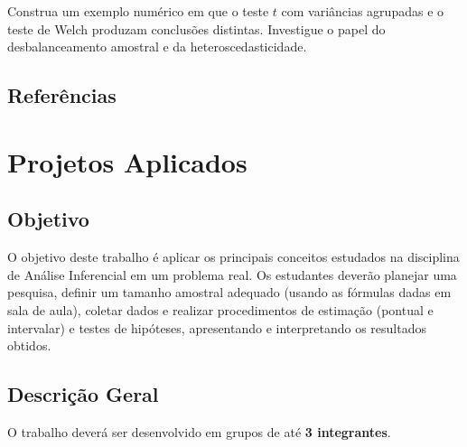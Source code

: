 \documentclass[
  letterpaper,
  DIV=11,
  numbers=noendperiod]{scrreprt}
\begin{document}
\begin{tcolorbox}[enhanced jigsaw, colback=white, leftrule=.75mm, colbacktitle=quarto-callout-note-color!10!white, breakable, titlerule=0mm, bottomtitle=1mm, title=\textcolor{quarto-callout-note-color}{\faInfo}\hspace{0.5em}{Exercício 20}, colframe=quarto-callout-note-color-frame, toprule=.15mm, opacityback=0, bottomrule=.15mm, opacitybacktitle=0.6, arc=.35mm, toptitle=1mm, rightrule=.15mm, coltitle=black, left=2mm]

Construa um exemplo numérico em que o teste \(t\) com variâncias
agrupadas e o teste de Welch produzam conclusões distintas. Investigue o
papel do desbalanceamento amostral e da heteroscedasticidade.

\end{tcolorbox}

\section*{Referências}\label{referuxeancias-5}



\chapter{Projetos Aplicados}\label{projetos-aplicados}

\section{Objetivo}\label{objetivo}

O objetivo deste trabalho é aplicar os principais conceitos estudados na
disciplina de Análise Inferencial em um problema real. Os estudantes
deverão planejar uma pesquisa, definir um tamanho amostral adequado
(usando as fórmulas dadas em sala de aula), coletar dados e realizar
procedimentos de estimação (pontual e intervalar) e testes de hipóteses,
apresentando e interpretando os resultados obtidos.

\section{Descrição Geral}\label{descriuxe7uxe3o-geral}

O trabalho deverá ser desenvolvido em grupos de até \textbf{3
integrantes}.
\end{document}
